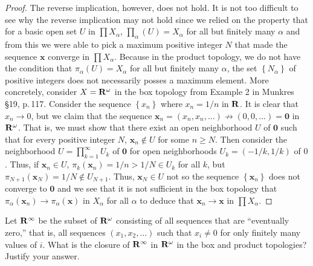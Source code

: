 \begin{proof}
The reverse implication, however, does not hold. It is not too
difficult to see why the reverse implication may not hold since
we relied on the property that for a basic open set $U$ in $\prod
X_\alpha$, $\prod_\alpha(U)=X_\alpha$ for all but finitely many
$\alpha$ and from this we were able to pick a maximum positive
integer $N$ that made the sequence $\mathbf{x}$ converge in
$\prod X_\alpha$. Because in the product topology, we do not have
the condition that $\pi_\alpha(U)=X_\alpha$ for all but finitely
many $\alpha$, the set $\left\{N_\alpha\right\}$ of positive
integers does not necessarily posses a maximum element. More
concretely, consider $X=\mathbf{R}^\omega$ in the box topology from
Example 2 in Munkres \S19, p.\,117. Consider the sequence
$\left\{x_n\right\}$ where $x_n=1/n$ in $\mathbf{R}$. It is clear that
$x_n\to 0$, but we claim that the sequence
$\mathbf{x}_n=(x_n,x_n,...)\nrightarrow(0,0,...)=\mathbf{0}$ in
$\mathbf{R}^\omega$. That is, we must show that there exist an open
neighborhood $U$ of $\mathbf{0}$ such that for every positive
integer $N$, $\mathbf{x}_n\notin U$ for some $n\geq N$. Then
consider the neighborhood $U=\prod_{k=1}^\infty U_k$ of
$\mathbf{0}$ for open neighborhoods $U_k=(-1/k,1/k)$ of
$0$. Thus, if $\mathbf{x}_n\in U$,
$\pi_k(\mathbf{x}_n)=1/n>1/N\in U_k$ for all $k$, but
$\pi_{N+1}(\mathbf{x}_N)=1/N\notin U_{N+1}$. Thus,
$\mathbf{x}_N\in U$ not so the sequence
$\left\{\mathbf{x}_n\right\}$ does not converge to $\mathbf{0}$
and we see that it is not sufficient in the box topology that
$\pi_\alpha(\mathbf{x}_n)\to\pi_\alpha(\mathbf{x})$ in $X_\alpha$
for all $\alpha$ to deduce that $\mathbf{x}_n\to\mathbf{x}$ in
$\prod X_\alpha$.
\end{proof}
\newpage
\begin{problem}[Munkres \S19, p.\,118, \#7]
Let $\mathbf{R}^\infty$ be the subset of $\mathbf{R}^\omega$ consisting of all
sequences that are ``eventually zero,'' that is, all sequences
$(x_1,x_2,...)$ such that $x_i\neq 0$ for only finitely many
values of $i$. What is the closure of $\mathbf{R}^\infty$ in
$\mathbf{R}^\omega$ in the box and product topologies? Justify your
answer.
\end{problem}
